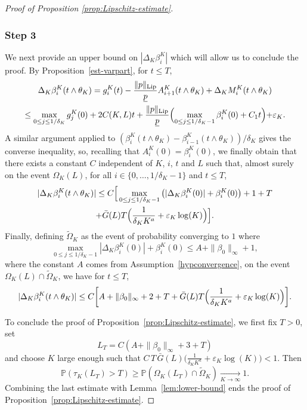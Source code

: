 \documentclass[JEP,XML,SOM,Unicode,published]{cedram}
\theoremstyle{plain}
\theoremstyle{remark}
\renewcommand\P{\mathbb{P}}
\begin{document}
\begin{proof}[Proof of Proposition \ref{prop:Lipschitz-estimate}]
{\subsubsection*{Step 3} We next provide an upper bound on $|\Delta_K\beta_i^K|$ which will allow us to conclude the proof.
By Proposition~\ref{est-varpart}, for $t\leq T$,
\begin{multline*}
\Delta_K\beta_i^K(t\wedge\theta_K) =g_i^K(t) - \frac{\|p\|_{\text{Lip}}}{\underline{p}} A_{i+1}^K(t\wedge\theta_K)+
\Delta_KM_i^K(t\wedge\theta_K) \\
\leq \max_{0\leq j\leq 1/\delta_K} g^K _j(0)+2 C(K,L) t+ \frac{\|p\|_{\text{Lip}}}{\underline{p}}\Bigl(\max_{0\leq j\leq 1/\delta_K-1}\beta^K_i(0)+C_1 t\Bigl)+\varepsilon_K.
\end{multline*}
A similar argument applied to $(\beta^K_i(t\wedge\theta_K)-\beta^K_{i-1}(t\wedge\theta_K))/\delta_K$ gives the converse inequality, so, recalling that $A^K_i(0)=\beta^K_i(0)$, we finally obtain that there exists a constant $C$ independent of $K$, $i$, $t$ and $L$ such that, almost surely on the event $\Omega_K(L)$, for all $i\in\{0,\ldots,1/\delta_K-1\}$ and $t\leq T$,
\begin{multline*}
|\Delta_K\beta_i^K(t\wedge\theta_K)|\leq C\Big[\max_{0\leq j\leq 1/\delta_K-1} \left(|\Delta_K \beta^K_i(0)|+\beta^K_i(0)\right)+1+T\\
+\bar{G}(L) T\Bigl(\frac{1}{\delta_K K^
a}+\varepsilon_K\log(K)\Bigr)\Big].
\end{multline*}
Finally, defining $\widetilde \Omega_K$ as the event of probability converging to $1$ where
\[\max_{0\leq j\leq 1/\delta_K-1} |\Delta_K \beta^K_i(0)|+\beta^K_i(0)\le A+\|\beta_0\|_\infty+1,\] where the constant $A$ comes from Assumption~\ref{hypconvergence}, on the event $\Omega_K(L) \cap \widetilde \Omega_K$, we have for $t\leq T$,
\begin{equation*}
|\Delta_K\beta_i^K(t\wedge\theta_K)|\leq C\biggl[A+\|\beta_0\|_\infty+2 +T+ \bar G(L) T\Bigl(\frac{1}{\delta_K K^
a}+\varepsilon_K\log(K)\Bigr)\biggr].
\end{equation*}

To conclude the proof of Proposition~\ref{prop:Lipschitz-estimate}, we first fix $T>0$, set
\begin{equation*}%
L_T=C(A+\|\beta_0\|_\infty+3+T)
\end{equation*}
and choose $K$ large enough such that $C\,T\,\bar G(L)\bigl(\frac{1}{\delta_K K^
a}+\varepsilon_K\log(K)\bigr)< 1$.
Then
\[\P(\tau_K(L_T)>T)\ge \P(\Omega_K(L_T)\cap \widetilde \Omega_K)\xrightarrow[K\to\infty]{} 1.\]
Combining the last estimate with Lemma~\ref{lem:lower-bound} ends the proof of Proposition~\ref{prop:Lipschitz-estimate}.}
\end{proof}
\end{document}
